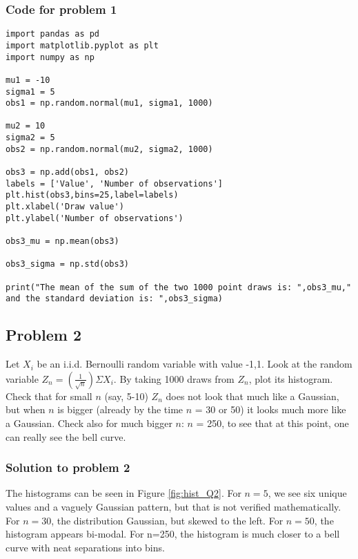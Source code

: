 \documentclass[12pt]{article}%
\begin{document}
\subsubsection{Code for problem 1}
\begin{lstlisting}
import pandas as pd
import matplotlib.pyplot as plt
import numpy as np

mu1 = -10
sigma1 = 5
obs1 = np.random.normal(mu1, sigma1, 1000)

mu2 = 10
sigma2 = 5
obs2 = np.random.normal(mu2, sigma2, 1000)

obs3 = np.add(obs1, obs2)
labels = ['Value', 'Number of observations']
plt.hist(obs3,bins=25,label=labels)
plt.xlabel('Draw value')
plt.ylabel('Number of observations')

obs3_mu = np.mean(obs3)

obs3_sigma = np.std(obs3)

print("The mean of the sum of the two 1000 point draws is: ",obs3_mu," and the standard deviation is: ",obs3_sigma)
\end{lstlisting}


\subsection{Problem 2}

Let $X_i$ be an i.i.d. Bernoulli random variable with value {-1,1}. Look at the random variable $Z_n = (\frac{1}{\sqrt{n}})\Sigma X_i$. By taking 1000 draws from $Z_n$, plot its histogram. Check that for small $n$ (say, 5-10) $Z_n$ does not look that much like a Gaussian, but when $n$ is bigger (already by the time $n$ = 30 or 50) it looks much more like a Gaussian. Check also for much bigger $n$: $n$ = 250, to see that at this point, one can really see the bell curve.\\


\subsubsection{Solution to problem 2}

The histograms can be seen in Figure \ref{fig:hist_Q2}. For $n=5$, we see six unique values and a vaguely Gaussian pattern, but that is not verified mathematically. For $n=30$, the distribution Gaussian, but skewed to the left. For $n=50$, the histogram appears bi-modal. For n=250, the histogram is much closer to a bell curve with neat separations into bins. \\
\end{document}
